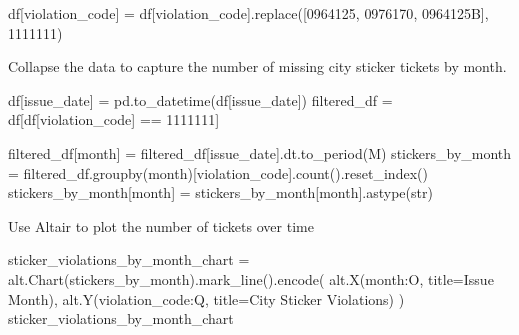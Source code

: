 \documentclass[
]{article}
\newenvironment{Shaded}{\begin{snugshade}}{\end{snugshade}}
\newcommand{\BuiltInTok}[1]{\textcolor[rgb]{0.00,0.23,0.31}{#1}}
\newcommand{\NormalTok}[1]{\textcolor[rgb]{0.00,0.23,0.31}{#1}}
\newcommand{\OperatorTok}[1]{\textcolor[rgb]{0.37,0.37,0.37}{#1}}
\newcommand{\StringTok}[1]{\textcolor[rgb]{0.13,0.47,0.30}{#1}}
\begin{document}
\begin{Shaded}
\begin{Highlighting}[]
\NormalTok{df[}\StringTok{\textquotesingle{}violation\_code\textquotesingle{}}\NormalTok{] }\OperatorTok{=}\NormalTok{ df[}\StringTok{\textquotesingle{}violation\_code\textquotesingle{}}\NormalTok{].replace([}\StringTok{\textquotesingle{}0964125\textquotesingle{}}\NormalTok{, }\StringTok{\textquotesingle{}0976170\textquotesingle{}}\NormalTok{, }\StringTok{\textquotesingle{}0964125B\textquotesingle{}}\NormalTok{], }\StringTok{\textquotesingle{}1111111\textquotesingle{}}\NormalTok{)}
\end{Highlighting}
\end{Shaded}

Collapse the data to capture the number of missing city sticker tickets
by month.

\begin{Shaded}
\begin{Highlighting}[]
\NormalTok{df[}\StringTok{\textquotesingle{}issue\_date\textquotesingle{}}\NormalTok{] }\OperatorTok{=}\NormalTok{ pd.to\_datetime(df[}\StringTok{\textquotesingle{}issue\_date\textquotesingle{}}\NormalTok{])}
\NormalTok{filtered\_df }\OperatorTok{=}\NormalTok{ df[df[}\StringTok{\textquotesingle{}violation\_code\textquotesingle{}}\NormalTok{] }\OperatorTok{==} \StringTok{\textquotesingle{}1111111\textquotesingle{}}\NormalTok{]}

\NormalTok{filtered\_df[}\StringTok{\textquotesingle{}month\textquotesingle{}}\NormalTok{] }\OperatorTok{=}\NormalTok{ filtered\_df[}\StringTok{\textquotesingle{}issue\_date\textquotesingle{}}\NormalTok{].dt.to\_period(}\StringTok{\textquotesingle{}M\textquotesingle{}}\NormalTok{)}
\NormalTok{stickers\_by\_month }\OperatorTok{=}\NormalTok{ filtered\_df.groupby(}\StringTok{\textquotesingle{}month\textquotesingle{}}\NormalTok{)[}\StringTok{\textquotesingle{}violation\_code\textquotesingle{}}\NormalTok{].count().reset\_index()}
\NormalTok{stickers\_by\_month[}\StringTok{\textquotesingle{}month\textquotesingle{}}\NormalTok{] }\OperatorTok{=}\NormalTok{ stickers\_by\_month[}\StringTok{\textquotesingle{}month\textquotesingle{}}\NormalTok{].astype(}\BuiltInTok{str}\NormalTok{)}
\end{Highlighting}
\end{Shaded}

Use Altair to plot the number of tickets over time

\begin{Shaded}
\begin{Highlighting}[]
\NormalTok{sticker\_violations\_by\_month\_chart }\OperatorTok{=}\NormalTok{ alt.Chart(stickers\_by\_month).mark\_line().encode(}
\NormalTok{    alt.X(}\StringTok{\textquotesingle{}month:O\textquotesingle{}}\NormalTok{, title}\OperatorTok{=}\StringTok{\textquotesingle{}Issue Month\textquotesingle{}}\NormalTok{),}
\NormalTok{    alt.Y(}\StringTok{\textquotesingle{}violation\_code:Q\textquotesingle{}}\NormalTok{, title}\OperatorTok{=}\StringTok{\textquotesingle{}City Sticker Violations\textquotesingle{}}\NormalTok{)}
\NormalTok{)}
\NormalTok{sticker\_violations\_by\_month\_chart}
\end{Highlighting}
\end{Shaded}
\end{document}
